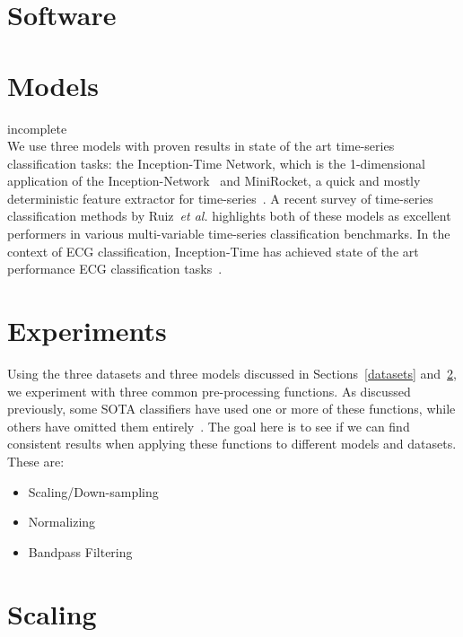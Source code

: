 \documentclass[pmlr,twocolumn]{jmlr}%
\begin{document}

\section{Software}
\label{sec:software}
\section{Models}
\label{sec:models}
{\color{red} incomplete}\\
We use three models with proven results in state of the art time-series classification tasks: the Inception-Time Network, which is the 1-dimensional application of the Inception-Network~\cite{szegedy2017inception,ismail2020inceptiontime} and MiniRocket, a quick and mostly deterministic feature extractor for time-series~\cite{dempster2021minirocket}. A recent survey of time-series classification methods by Ruiz~\textit{et al.} highlights both of these models as excellent performers in various multi-variable time-series classification benchmarks. In the context of ECG classification, Inception-Time has achieved state of the art performance ECG classification tasks~\cite{Strodthoff2021}.

\section{Experiments}
\label{sec:experiment}
Using the three datasets and three models discussed in Sections~\ref{datasets} and~\ref{sec:models}, we experiment with three common pre-processing functions. As discussed previously, some SOTA classifiers have used one or more of these functions, while others have omitted them entirely~\cite{ribeiro2020automatic}. The goal here is to see if we can find consistent results when applying these functions to different models and datasets. These are:
\begin{itemize}
    \item Scaling/Down-sampling
    \item Normalizing
    \item Bandpass Filtering
\end{itemize}

\section{Scaling}
\label{sec:scaling}





\end{document}

